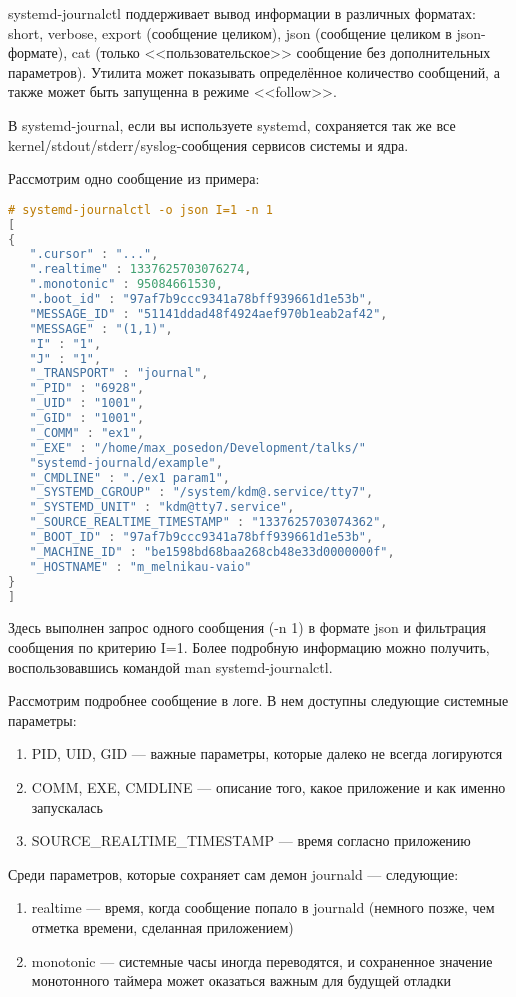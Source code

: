 \documentclass[10pt, a5paper]{article}
\begin{document}
systemd-journalctl поддерживает вывод информации в различных форматах: short, verbose, export (сообщение целиком), json (сообщение целиком в json-формате), cat (только <<пользовательское>> сообщение без дополнительных параметров). Утилита может показывать определённое количество сообщений, а также может быть запущенна в режиме <<follow>>.

В systemd-journal, если вы используете systemd, сохраняется так же все kernel/stdout/stderr/syslog-сообщения сервисов системы и ядра.

Рассмотрим одно сообщение из примера:

\begin{lstlisting}[language=C]
# systemd-journalctl -o json I=1 -n 1
[
{
   ".cursor" : "...",
   ".realtime" : 1337625703076274,
   ".monotonic" : 95084661530,
   ".boot_id" : "97af7b9ccc9341a78bff939661d1e53b",
   "MESSAGE_ID" : "51141ddad48f4924aef970b1eab2af42",
   "MESSAGE" : "(1,1)",
   "I" : "1",
   "J" : "1",
   "_TRANSPORT" : "journal",
   "_PID" : "6928",
   "_UID" : "1001",
   "_GID" : "1001",
   "_COMM" : "ex1",
   "_EXE" : "/home/max_posedon/Development/talks/"
   "systemd-journald/example",
   "_CMDLINE" : "./ex1 param1",
   "_SYSTEMD_CGROUP" : "/system/kdm@.service/tty7",
   "_SYSTEMD_UNIT" : "kdm@tty7.service",
   "_SOURCE_REALTIME_TIMESTAMP" : "1337625703074362",
   "_BOOT_ID" : "97af7b9ccc9341a78bff939661d1e53b",
   "_MACHINE_ID" : "be1598bd68baa268cb48e33d0000000f",
   "_HOSTNAME" : "m_melnikau-vaio"
}
]
\end{lstlisting}

Здесь выполнен запрос одного сообщения (-n 1) в формате json и фильтрация сообщения по критерию I=1. Более подробную информацию можно получить, воспользовавшись командой man systemd-journalctl.

Рассмотрим подробнее сообщение в логе. В нем доступны следующие системные параметры:

\begin{enumerate}
  \item PID, UID, GID --- важные параметры, которые далеко не всегда логируются
  \item COMM, EXE, CMDLINE --- описание того, какое приложение и как именно запускалась
  \item SOURCE\_REALTIME\_TIMESTAMP --- время согласно приложению
\end{enumerate}

Среди параметров, которые сохраняет сам демон journald --- следующие:

\begin{enumerate}
  \item realtime --- время, когда сообщение попало в journald (немного позже, чем отметка времени, сделанная приложением)
  \item monotonic --- системные часы иногда переводятся, и сохраненное значение монотонного таймера может оказаться важным для будущей отладки
\end{enumerate}
\end{document}

